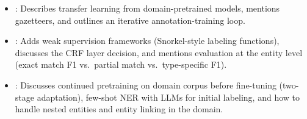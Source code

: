 \begin{interviewq}

\goodgreat
\begin{itemize}
    \item {}: Describes transfer learning from domain-pretrained models, mentions
    gazetteers, and outlines an iterative annotation-training loop.
    \item {}: Adds weak supervision frameworks (Snorkel-style labeling functions),
    discusses the CRF layer decision, and mentions evaluation at the entity level (exact match
    F1 vs.\ partial match vs.\ type-specific F1).
    \item {}: Discusses continued pretraining on domain corpus before
    fine-tuning (two-stage adaptation), few-shot NER with LLMs for initial labeling, and
    how to handle nested entities and entity linking in the domain.
\end{itemize}

\end{interviewq}

\vspace{0.5em}

